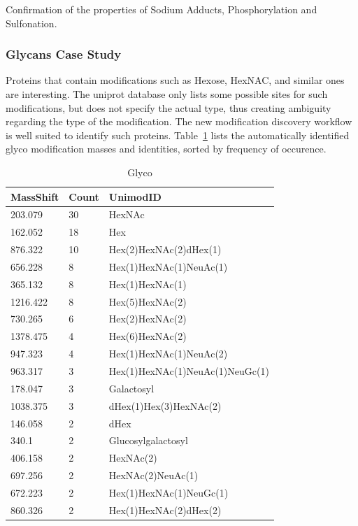 \documentclass[journal=jprobs,manuscript=article]{achemso}
\begin{document}
Confirmation of the properties of Sodium Adducts, Phosphorylation and Sulfonation.
\subsubsection{Glycans Case Study}
Proteins that contain modifications such as Hexose, HexNAC, and similar ones are interesting.
The uniprot database only lists some possible sites for such modifications, but does not specify the actual type, thus creating ambiguity regarding the type of the modification.
The new modification discovery workflow is well suited to identify such proteins.
Table~\ref{tbl:glyco} lists the automatically identified glyco modification masses and identities, sorted by frequency of occurence. 

\begin{table}[]
\centering
\caption{Glyco}
\label{tbl:glyco}
\begin{tabular}{lll}
MassShift & Count & UnimodID                        \\
\hline
203.079   & 30    & HexNAc                          \\
162.052   & 18    & Hex                             \\
876.322   & 10    & Hex(2)HexNAc(2)dHex(1)          \\
656.228   & 8     & Hex(1)HexNAc(1)NeuAc(1)         \\
365.132   & 8     & Hex(1)HexNAc(1)                 \\
1216.422  & 8     & Hex(5)HexNAc(2)                 \\
730.265   & 6     & Hex(2)HexNAc(2)                 \\
1378.475  & 4     & Hex(6)HexNAc(2)                 \\
947.323   & 4     & Hex(1)HexNAc(1)NeuAc(2)         \\
963.317   & 3     & Hex(1)HexNAc(1)NeuAc(1)NeuGc(1) \\
178.047   & 3     & Galactosyl                      \\
1038.375  & 3     & dHex(1)Hex(3)HexNAc(2)          \\
146.058   & 2     & dHex                            \\
340.1     & 2     & Glucosylgalactosyl              \\
406.158   & 2     & HexNAc(2)                       \\
697.256   & 2     & HexNAc(2)NeuAc(1)               \\
672.223   & 2     & Hex(1)HexNAc(1)NeuGc(1)         \\
860.326   & 2     & Hex(1)HexNAc(2)dHex(2)         
\end{tabular}
\end{table}
\end{document}
